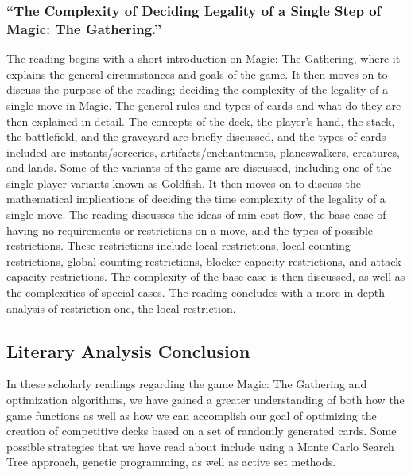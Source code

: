 \documentclass[12pt, letterpaper]{article}
\begin{document}
\subsubsection{\enquote{The Complexity of Deciding Legality of a Single Step of Magic: The Gathering.}}

The reading begins with a short introduction on Magic: The Gathering,
where it explains the general circumstances and goals of the game.
It then moves on to discuss the purpose of the reading;
deciding the complexity of the legality of a single move in Magic.
The general rules and types of cards and what do they are then explained in detail.
The concepts of the deck, the player’s hand, the stack, the battlefield,
and the graveyard are briefly discussed, and the types of cards included are instants/sorceries,
artifacts/enchantments, planeswalkers, creatures, and lands.
Some of the variants of the game are discussed,
including one of the single player variants known as Goldfish.
It then moves on to discuss the mathematical implications of
deciding the time complexity of the legality of a single move.
The reading discusses the ideas of min-cost flow,
the base case of having no requirements or restrictions on a move,
and the types of possible restrictions.
These restrictions include local restrictions, local counting restrictions,
global counting restrictions, blocker capacity restrictions, and attack capacity restrictions.
The complexity of the base case is then discussed,
as well as the complexities of special cases.
The reading concludes with a more in depth analysis of restriction one, the local restriction.

\subsection{Literary Analysis Conclusion}

In these scholarly readings regarding the game Magic: The Gathering and optimization algorithms, we have gained a
greater understanding of both how the game functions as well as how we can accomplish our goal of optimizing the creation
of competitive decks based on a set of randomly generated cards. Some possible strategies that we have read about include
using a Monte Carlo Search Tree approach, genetic programming, as well as active set methods.
\end{document}
